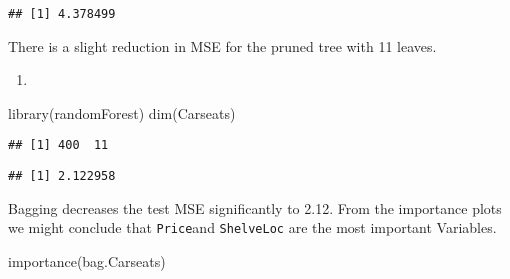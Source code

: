 \documentclass[
]{article}
\newenvironment{Shaded}{\begin{snugshade}}{\end{snugshade}}
\newcommand{\AttributeTok}[1]{\textcolor[rgb]{0.77,0.63,0.00}{#1}}
\newcommand{\ConstantTok}[1]{\textcolor[rgb]{0.00,0.00,0.00}{#1}}
\newcommand{\DecValTok}[1]{\textcolor[rgb]{0.00,0.00,0.81}{#1}}
\newcommand{\FunctionTok}[1]{\textcolor[rgb]{0.00,0.00,0.00}{#1}}
\newcommand{\NormalTok}[1]{#1}
\newcommand{\OtherTok}[1]{\textcolor[rgb]{0.56,0.35,0.01}{#1}}
\newcommand{\SpecialCharTok}[1]{\textcolor[rgb]{0.00,0.00,0.00}{#1}}
\providecommand{\tightlist}{%
  \setlength{\itemsep}{0pt}\setlength{\parskip}{0pt}}
\begin{document}
\begin{verbatim}
## [1] 4.378499
\end{verbatim}

There is a slight reduction in MSE for the pruned tree with 11 leaves.

\begin{enumerate}
\def\labelenumi{\alph{enumi})}
\setcounter{enumi}{3}
\tightlist
\item
\end{enumerate}

\begin{Shaded}
\begin{Highlighting}[]
\FunctionTok{library}\NormalTok{(randomForest)}
\FunctionTok{dim}\NormalTok{(Carseats)}
\end{Highlighting}
\end{Shaded}

\begin{verbatim}
## [1] 400  11
\end{verbatim}

\begin{Shaded}
\end{Shaded}

\begin{verbatim}
## [1] 2.122958
\end{verbatim}

Bagging decreases the test MSE significantly to 2.12. From the
importance plots we might conclude that \texttt{Price}and
\texttt{ShelveLoc} are the most important Variables.

\begin{Shaded}
\begin{Highlighting}[]
\FunctionTok{importance}\NormalTok{(bag.Carseats)}
\end{Highlighting}
\end{Shaded}
\end{document}
